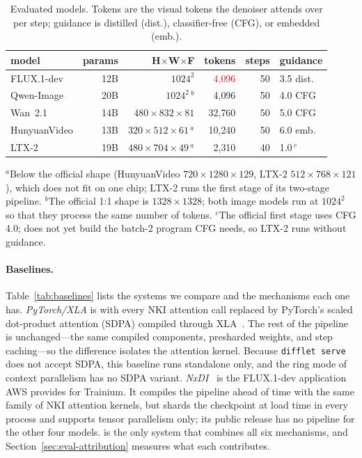 \begin{table}[t]
\caption{Evaluated models. Tokens are the visual tokens the denoiser attends over per step; guidance is distilled (dist.), classifier-free (CFG), or embedded (emb.).}
\label{tab:workloads}
\centering
\footnotesize
\setlength{\tabcolsep}{2.2pt}
\begin{tabular}{@{}lrrrrl@{}}
\toprule
model & params & H$\times$W$\times$F & tokens & steps & guidance \\
\midrule
FLUX.1-dev   & 12B & $1024^2$                      & \textcolor{red}{4{,}096}  & 50 & 3.5 dist. \\
Qwen-Image   & 20B & $1024^2$\,$^{b}$              & 4{,}096  & 50 & 4.0 CFG \\
Wan~2.1      & 14B & $480{\times}832{\times}81$        & 32{,}760 & 50 & 5.0 CFG \\
HunyuanVideo & 13B & $320{\times}512{\times}61$\,$^{a}$ & 10{,}240 & 50 & 6.0 emb. \\
LTX-2        & 19B & $480{\times}704{\times}49$\,$^{a}$ & 2{,}310  & 40 & 1.0\,$^{c}$ \\
\bottomrule
\end{tabular}
\par\smallskip
{\raggedright\scriptsize
$^{a}$Below the official shape (HunyuanVideo $720\times1280\times129$, LTX-2 $512\times768\times121$), which does not fit on one chip; LTX-2 runs the first stage of its two-stage pipeline. $^{b}$The official 1:1 shape is $1328\times1328$; both image models run at $1024^2$ so that they process the same number of tokens. $^{c}$The official first stage uses CFG 4.0; \name does not yet build the batch-2 program CFG needs, so LTX-2 runs without guidance.\par}
\vskip -0.1in
\end{table}

\paragraph{Baselines.}
Table~\ref{tab:baselines} lists the systems we compare and the mechanisms each one has. \emph{PyTorch/XLA} is \name with every NKI attention call replaced by PyTorch's scaled dot-product attention (SDPA) compiled through XLA~\cite{pytorch-xla}. The rest of the pipeline is unchanged---the same compiled components, presharded weights, and step caching---so the difference isolates the attention kernel. Because \texttt{difflet serve} does not accept SDPA, this baseline runs standalone only, and the ring mode of context parallelism has no SDPA variant. \emph{NxDI}~\cite{nxdi} is the FLUX.1-dev application AWS provides for Trainium. It compiles the pipeline ahead of time with the same family of NKI attention kernels, but shards the checkpoint at load time in every process and supports tensor parallelism only; its public release has no pipeline for the other four models. \name is the only system that combines all six mechanisms, and Section~\ref{sec:eval-attribution} measures what each contributes.

